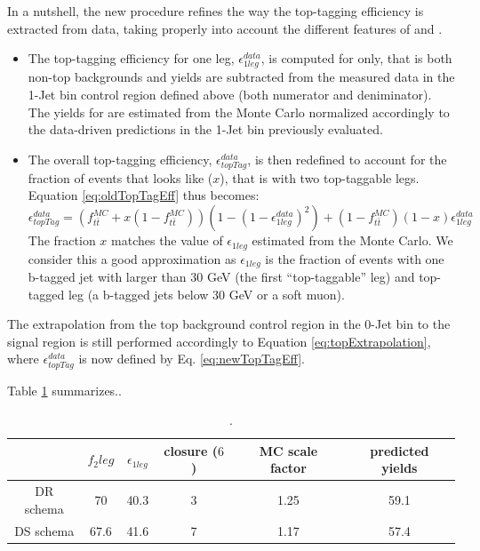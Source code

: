 In a nutshell, the new procedure refines the way the top-tagging efficiency is extracted from data,
taking properly into account the different features of \ttbar and \tw.
\begin{itemize}

\item The top-tagging efficiency for one leg, $\epsilon_{1leg}^{data}$, is computed for \ttbar only, 
that is both non-top backgrounds and \tw yields are subtracted from the measured data 
in the 1-Jet bin control region defined above (both numerator and deniminator).
The yields for \tw are estimated from the Monte Carlo normalized accordingly to the data-driven predictions
in the 1-Jet bin previously evaluated. 

\item The overall top-tagging efficiency, $\epsilon_{topTag}^{data}$, is then redefined 
to account for the fraction of \tw events that looks like \ttbar ($x$), that is with two top-taggable legs. 
Equation \ref{eq:oldTopTagEff} thus becomes:
\begin{equation} \label{eq:newTopTagEff}
\epsilon_{topTag}^{data} = (f_{t\bar{t}}^{MC} + x(1-f_{t\bar{t}}^{MC}) )(1-(1-\epsilon_{1leg}^{data})^2) + (1-f_{t\bar{t}}^{MC})(1-x)\epsilon_{1leg}^{data}
\end{equation} 
The fraction $x$ matches the value of $\epsilon_{1leg}$ estimated from the \tw Monte Carlo. 
We consider this a good approximation as $\epsilon_{1leg}$ is the fraction of events 
with one b-tagged jet with \pt larger than 30 GeV (the first ``top-taggable'' leg) and top-tagged leg
(a b-tagged jets below 30 GeV or a soft muon).

\end{itemize}

The extrapolation from the top background control region in the 0-Jet bin to the signal \WW region is still
performed accordingly to Equation \ref{eq:topExtrapolation}, where $\epsilon_{topTag}^{data}$ is now defined by
Eq. \ref{eq:newTopTagEff}.


Table \ref{tab:topNormalization} summarizes..

\begin{table}[!ht]
  \begin{center}
  {\normalsize
   \begin{tabular} {|c|c|c|c|c|c|}
   \hline
       & $f_2leg$ & $\epsilon_{1leg}$ & closure ($6$) & MC scale factor & predicted yields \\
   \hline  
    DR schema & 70   & 40.3  & 3  & 1.25 & 59.1   \\
   \hline
    DS schema & 67.6 & 41.6  & 7  & 1.17 & 57.4   \\
   \hline
   \end{tabular}
  }
  \caption{.}
   \label{tab:topNormalization}
  \end{center}
\end{table}

